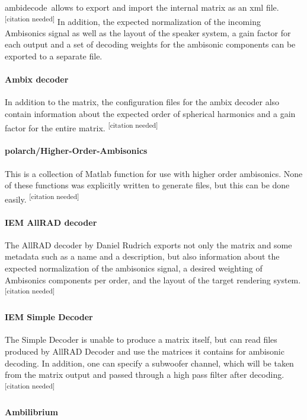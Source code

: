 \documentclass[a4paper, 10pt, twocolumn]{article}
\newcommand{\citationneeded}[1][]{\textsuperscript{\color{black} [citation needed]}}
\begin{document}
ambidecode\texttildelow\ allows to export and import the internal matrix as an xml file.\citationneeded{} In addition, the expected normalization of the incoming Ambisonics signal as well as the layout of the speaker system, a gain factor for each output and a set of decoding weights for the ambisonic components can be exported to a separate file.

\paragraph{Ambix decoder}

In addition to the matrix, the configuration files for the ambix decoder also contain information about the expected order of spherical harmonics and a gain factor for the entire matrix.\citationneeded{}

\paragraph{polarch/Higher-Order-Ambisonics}

This is a collection of Matlab function for use with higher order ambisonics. None of these functions was explicitly written to generate files, but this can be done easily.\citationneeded{}

\paragraph{IEM AllRAD decoder}

The AllRAD decoder by Daniel Rudrich exports not only the matrix and some metadata such as a name and a description, but also information about the expected normalization of the ambisonics signal, a desired weighting of Ambisonics components per order, and the layout of the target rendering system.\citationneeded{}

\paragraph{IEM Simple Decoder}

The Simple Decoder is unable to produce a matrix itself, but can read files produced by AllRAD Decoder and use the matrices it contains for ambisonic decoding. In addition, one can specify a subwoofer channel, which will be taken from the matrix output and passed through a high pass filter after decoding.\citationneeded{}

\paragraph{Ambilibrium}
\end{document}

